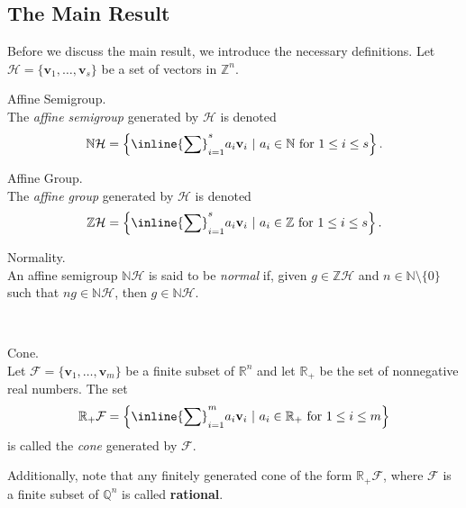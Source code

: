 \documentclass[a0, landscape]{a0poster}
\begin{document}
\begin{multicols}{4}
\columnbreak


\section*{\color{DarkSlateBlue}The Main Result}

Before we discuss the main result, we introduce the necessary definitions. Let $\mathcal{H}=\{\mathbf{v}_1,\ldots,\mathbf{v}_s\}$ be a set of vectors in $\mathbb{Z}^n$.

\begin{definition}{Affine Semigroup.}\label{Affine Semigroup}\\
The \textit{affine semigroup} generated by $\mathcal{H}$ is denoted $$\mathbb{N}\mathcal{H} = \left\{ \inline{\sum}_{i=1}^s a_i \mathbf{v}_i \ | \ a_i \in \mathbb{N} \text{ for $1 \leq i \leq s$} \right\}.$$
\end{definition}

\begin{definition}{Affine Group.}\label{Affine group}\\
The \textit{affine group} generated by $\mathcal{H}$ is denoted $$\mathbb{Z}\mathcal{H} = \left\{ \inline{\sum}_{i=1}^s a_i \mathbf{v}_i \ | \ a_i \in \mathbb{Z} \text{ for $1 \leq i \leq s$} \right\}.$$
\end{definition}

\begin{definition}{Normality.}\label{affine normality}\\
An affine semigroup $\mathbb{N}\mathcal{H}$ is said to be \textit{normal} if, given $g \in \mathbb{Z}\mathcal{H}$ and $n \in \mathbb{N} \setminus \{0\}$ such that $ng \in \mathbb{N}\mathcal{H}$, then $g \in \mathbb{N}\mathcal{H}$.
\end{definition}

\

\begin{definition}{Cone.}\label{cone}\\
Let $\mathcal{F} = \{ \mathbf{v}_1, \dots, \mathbf{v}_m \}$ be a finite subset of $\mathbb{R}^n$ and let $\mathbb{R}_+$ be the set of nonnegative real numbers. The set
$$\mathbb{R}_+\mathcal{F} = \left\{ \inline{\sum}_{i=1}^m a_i \mathbf{v}_i \ | \ a_i \in \mathbb{R}_+ \text{ for $1 \leq i \leq m$} \right\}$$
is called the \emph{cone} generated by $\mathcal{F}$.
\end{definition}

Additionally, note that any finitely generated cone of the form $\mathbb{R}_+ \mathcal{F}$, where $\mathcal{F}$ is a finite subset of $\mathbb{Q}^n$ is called \textbf{rational}.


\end{multicols}
\end{document}
